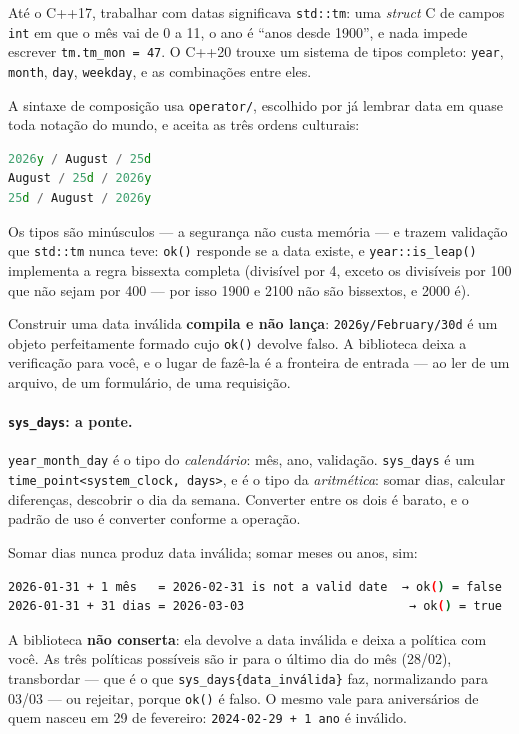 Até o C++17, trabalhar com datas significava \texttt{std::tm}: uma \emph{struct}
C de campos \texttt{int} em que o mês vai de 0 a 11, o ano é ``anos desde
1900'', e nada impede escrever \texttt{tm.tm\_mon = 47}. O C++20 trouxe um
sistema de tipos completo: \texttt{year}, \texttt{month}, \texttt{day},
\texttt{weekday}, e as combinações entre eles.

A sintaxe de composição usa \texttt{operator/}, escolhido por já lembrar data em
quase toda notação do mundo, e aceita as três ordens culturais:

\begin{lstlisting}[style=bt, language=C++,
    caption={As três ordens, todas válidas e todas o mesmo dia.}]
2026y / August / 25d
August / 25d / 2026y
25d / August / 2026y
\end{lstlisting}

Os tipos são minúsculos --- a segurança não custa memória --- e trazem
validação que \texttt{std::tm} nunca teve: \texttt{ok()} responde se a data
existe, e \texttt{year::is\_leap()} implementa a regra bissexta completa
(divisível por 4, exceto os divisíveis por 100 que não sejam por 400 --- por
isso 1900 e 2100 não são bissextos, e 2000 é).

\begin{armadilha}
Construir uma data inválida \textbf{compila e não lança}:
\texttt{2026y/February/30d} é um objeto perfeitamente formado cujo
\texttt{ok()} devolve falso. A biblioteca deixa a verificação para você, e o
lugar de fazê-la é a fronteira de entrada --- ao ler de um arquivo, de um
formulário, de uma requisição.
\end{armadilha}

\paragraph{\texttt{sys\_days}: a ponte.} \texttt{year\_month\_day} é o tipo do
\emph{calendário}: mês, ano, validação. \texttt{sys\_days} é um
\texttt{time\_point<system\_clock, days>}, e é o tipo da \emph{aritmética}:
somar dias, calcular diferenças, descobrir o dia da semana. Converter entre os
dois é barato, e o padrão de uso é converter conforme a operação.

\begin{armadilha}
Somar dias nunca produz data inválida; somar meses ou anos, sim:
\begin{lstlisting}[style=bt, language=bash, frame=none,
                   xleftmargin=0pt, xrightmargin=0pt]
2026-01-31 + 1 mês   = 2026-02-31 is not a valid date  → ok() = false
2026-01-31 + 31 dias = 2026-03-03                       → ok() = true
\end{lstlisting}
A biblioteca \textbf{não conserta}: ela devolve a data inválida e deixa a
política com você. As três políticas possíveis são ir para o último dia do mês
(28/02), transbordar --- que é o que \texttt{sys\_days\{data\_inválida\}} faz,
normalizando para 03/03 --- ou rejeitar, porque \texttt{ok()} é falso. O mesmo
vale para aniversários de quem nasceu em 29 de fevereiro:
\texttt{2024-02-29 + 1 ano} é inválido.
\end{armadilha}

